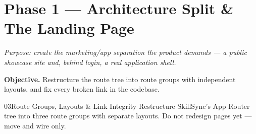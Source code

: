 \documentclass[11pt,a4paper]{article}
\newcommand{\objective}[1]{\noindent\textbf{Objective.} #1\medskip}
\begin{document}
\section{Phase 1 --- Architecture Split \& The Landing Page}

\textit{Purpose: create the marketing/app separation the product demands ---
a public showcase site and, behind login, a real application shell.}

\objective{Restructure the route tree into route groups with independent layouts,
and fix every broken link in the codebase.}

\begin{promptbox}{03}{Route Groups, Layouts \& Link Integrity}
Restructure SkillSync's App Router tree into three route groups with separate
layouts. Do not redesign pages yet --- move and wire only.


\end{promptbox}
\end{document}
